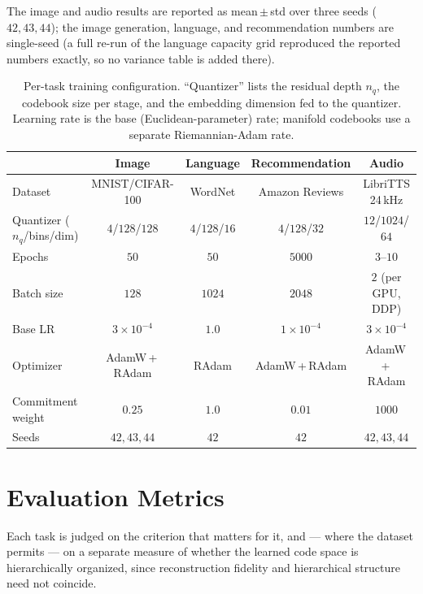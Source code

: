 \documentclass[12pt]{report}
\begin{document}
The image and audio results are reported as mean\,$\pm$\,std over three seeds ($42,43,44$); the image generation, language, and recommendation numbers are single-seed (a full re-run of the language capacity grid reproduced the reported numbers exactly, so no variance table is added there).

\begin{table}[h]
\centering
\caption{Per-task training configuration. ``Quantizer'' lists the residual depth $n_q$, the codebook size per stage, and the embedding dimension fed to the quantizer. Learning rate is the base (Euclidean-parameter) rate; manifold codebooks use a separate Riemannian-Adam rate.}
\label{tab:hparams}
\begin{tabular}{lcccc}
\hline
 & Image & Language & Recommendation & Audio \\
\hline
Dataset & MNIST/CIFAR-100 & WordNet & Amazon Reviews & LibriTTS 24\,kHz \\
Quantizer ($n_q$/bins/dim) & $4$/$128$/$128$ & $4$/$128$/$16$ & $4$/$128$/$32$ & $12$/$1024$/$64$ \\
Epochs & $50$ & $50$ & $5000$ & $3$--$10$ \\
Batch size & $128$ & $1024$ & $2048$ & $2$ (per GPU, DDP) \\
Base LR & $3\!\times\!10^{-4}$ & $1.0$ & $1\!\times\!10^{-4}$ & $3\!\times\!10^{-4}$ \\
Optimizer & AdamW\,+\,RAdam & RAdam & AdamW\,+\,RAdam & AdamW\,+\,RAdam \\
Commitment weight & $0.25$ & $1.0$ & $0.01$ & $1000$ \\
Seeds & $42,43,44$ & $42$ & $42$ & $42,43,44$ \\
\hline
\end{tabular}
\end{table}

\section{Evaluation Metrics}
\label{sec:metrics}

Each task is judged on the criterion that matters for it, and --- where the dataset permits --- on a separate measure of whether the learned code space is hierarchically organized, since reconstruction fidelity and hierarchical structure need not coincide.
\end{document}
